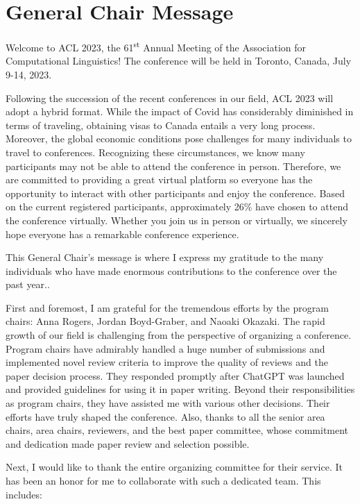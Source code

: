 \section{General Chair Message}

Welcome to ACL 2023, the 61\textsuperscript{st} Annual Meeting of the Association for Computational Linguistics! The conference will be held in Toronto, Canada, July 9-14, 2023.

Following the succession of the recent conferences in our field, ACL 2023 will adopt a hybrid format. While the impact of Covid has considerably diminished in terms of traveling, obtaining visas to Canada entails a very long process. Moreover, the global economic conditions pose challenges for many individuals to travel to conferences. Recognizing these circumstances, we know many participants may not be able to attend the conference in person. Therefore, we are committed to providing a great virtual platform so everyone has the opportunity to interact with other participants and enjoy the conference. Based on the current registered participants, approximately 26\% have chosen to attend the conference virtually. Whether you join us in person or virtually, we sincerely hope everyone has a remarkable conference experience.


This General Chair's message is where I express my gratitude to the many individuals who have made enormous contributions to the conference over the past year..

First and foremost, I am grateful for the tremendous efforts by the program chairs: Anna Rogers, Jordan Boyd-Graber, and Naoaki Okazaki. The rapid growth of our field is challenging from the perspective of organizing a conference. Program chairs have admirably handled a huge number of submissions and implemented novel review criteria to improve the quality of reviews and the paper decision process. They responded promptly after ChatGPT was launched and provided guidelines for using it in paper writing. Beyond their responsibilities as program chairs, they have assisted me with various other decisions. Their efforts have truly shaped the conference. Also, thanks to all the senior area chairs, area chairs, reviewers, and the best paper committee, whose commitment and dedication made paper review and selection possible.

Next, I would like to thank the entire organizing committee for their service. It has been an honor for me to collaborate with such a dedicated team. This includes:

